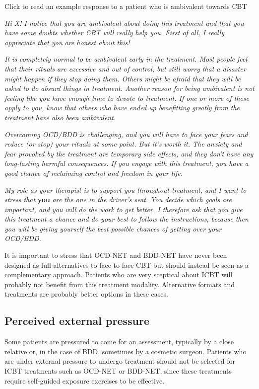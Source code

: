 \documentclass[]{book}
\begin{document}
Click to read an example response to a patient who is ambivalent towards CBT

\emph{Hi X! I notice that you are ambivalent about doing this treatment and that you have some doubts whether CBT will really help you. First of all, I really appreciate that you are honest about this!}

\emph{It is completely normal to be ambivalent early in the treatment. Most people feel that their rituals are excessive and out of control, but still worry that a disaster might happen if they stop doing them. Others might be afraid that they will be asked to do absurd things in treatment. Another reason for being ambivalent is not feeling like you have enough time to devote to treatment. If one or more of these apply to you, know that others who have ended up benefitting greatly from the treatment have also been ambivalent.}

\emph{Overcoming OCD/BDD is challenging, and you will have to face your fears and reduce (or stop) your rituals at some point. But it's worth it. The anxiety and fear provoked by the treatment are temporary side effects, and they don't have any long-lasting harmful consequences. If you engage with this treatment, you have a good chance of reclaiming control and freedom in your life.}

\emph{My role as your therapist is to support you throughout treatment, and I want to stress that} \textbf{you} \emph{are the one in the driver's seat. You decide which goals are important, and you will do the work to get better. I therefore ask that you give this treatment a chance and do your best to follow the instructions, because then you will be giving yourself the best possible chances of getting over your OCD/BDD.}

It is important to stress that OCD-NET and BDD-NET have never been designed as full alternatives to face-to-face CBT but should instead be seen as a complementary approach. Patients who are very sceptical about ICBT will probably not benefit from this treatment modality. Alternative formats and treatments are probably better options in these cases.

\hypertarget{perceived-external-pressure}{%
\subsection{Perceived external pressure}\label{perceived-external-pressure}}

Some patients are pressured to come for an assessment, typically by a close relative or, in the case of BDD, sometimes by a cosmetic surgeon. Patients who are under external pressure to undergo treatment should not be selected for ICBT treatments such as OCD-NET or BDD-NET, since these treatments require self-guided exposure exercises to be effective.
\end{document}
